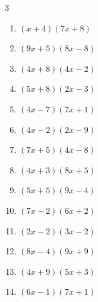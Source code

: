 \begin{multicols}{3}
\begin{enumerate}

  \item $(x+4)(7x+8)$


  \item $(9x+5)(8x-8)$


  \item $(4x+8)(4x-2)$


  \item $(5x+8)(2x-3)$


  \item $(4x-7)(7x+1)$


  \item $(4x-2)(2x-9)$


  \item $(7x+5)(4x-8)$


  \item $(4x+3)(8x+5)$


\columnbreak %

\resetques

  \item $(5x+5)(9x-4)$


  \item $(7x-2)(6x+2)$


  \item $(2x-2)(3x-2)$


  \item $(8x-4)(9x+9)$


  \item $(4x+9)(5x+3)$


  \item $(6x-1)(7x+1)$


\end{enumerate}
\end{multicols}
